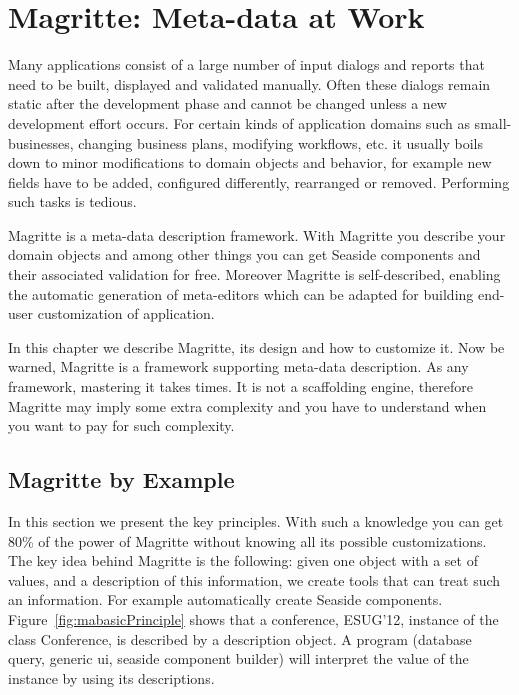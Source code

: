 \documentclass[a4paper,10pt,twoside]{book}
\begin{document}
    \sloppy
\fi



\chapter{Magritte: Meta-data at Work}
\label{cha:magritte}

Many applications consist of a large number of input dialogs and reports 
that need to be built, displayed and validated manually. Often these dialogs 
remain static after the development phase and cannot be changed unless a 
new development effort occurs.  For certain kinds of application domains such 
as small-businesses, changing business plans, modifying workflows, etc. it usually boils down to minor modifications to domain objects and behavior, for example new fields have to be  added, configured differently, rearranged or removed. Performing such tasks is tedious. 

Magritte is a meta-data description framework. With Magritte you describe your domain objects 
and among other things you can get Seaside components and their associated validation for free.  
Moreover Magritte is self-described, enabling the automatic generation of meta-editors which can 
be adapted for building end-user customization of application. 

In this chapter we describe Magritte, its design and how to customize it. Now be warned, Magritte
is a framework supporting meta-data description. As any framework, mastering it takes times. 
It is not a scaffolding engine, therefore Magritte may imply some extra complexity and 
you have to understand when you want to pay for such complexity. %



\section{Magritte by Example}
In this section we present the key principles. With such a knowledge you can get 80\% of the power of Magritte
without knowing all its possible customizations. The key idea behind Magritte is the following: given one object with a set of values, and a description of this information, we create tools that can treat such an information. For example automatically create Seaside components. Figure~\ref{fig:mabasicPrinciple} shows that a conference, ESUG'12, instance of the class Conference, is described by a description object. A program (database query, generic ui, seaside component builder) will interpret the value of the instance by using its descriptions. 
\end{document}
